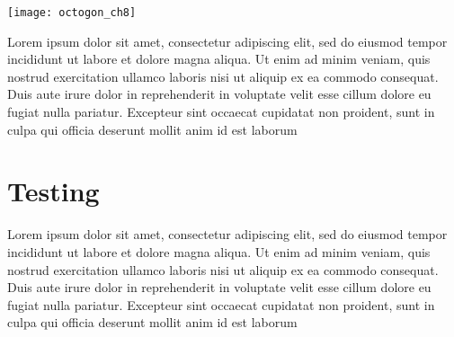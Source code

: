 \begin{minipage}{\linewidth}
\texttt{[image: octogon\_ch8]}
\end{minipage}

\par Lorem ipsum dolor sit amet, consectetur adipiscing elit, sed do eiusmod tempor incididunt ut labore et dolore magna aliqua. Ut enim ad minim veniam, quis nostrud exercitation ullamco laboris nisi ut aliquip ex ea commodo consequat. Duis aute irure dolor in reprehenderit in voluptate velit esse cillum dolore eu fugiat nulla pariatur. Excepteur sint occaecat cupidatat non proident, sunt in culpa qui officia deserunt mollit anim id est laborum

\section{Testing}
\label{sec:ch3sec5}

\par Lorem ipsum dolor sit amet, consectetur adipiscing elit, sed do eiusmod tempor incididunt ut labore et dolore magna aliqua. Ut enim ad minim veniam, quis nostrud exercitation ullamco laboris nisi ut aliquip ex ea commodo consequat. Duis aute irure dolor in reprehenderit in voluptate velit esse cillum dolore eu fugiat nulla pariatur. Excepteur sint occaecat cupidatat non proident, sunt in culpa qui officia deserunt mollit anim id est laborum
